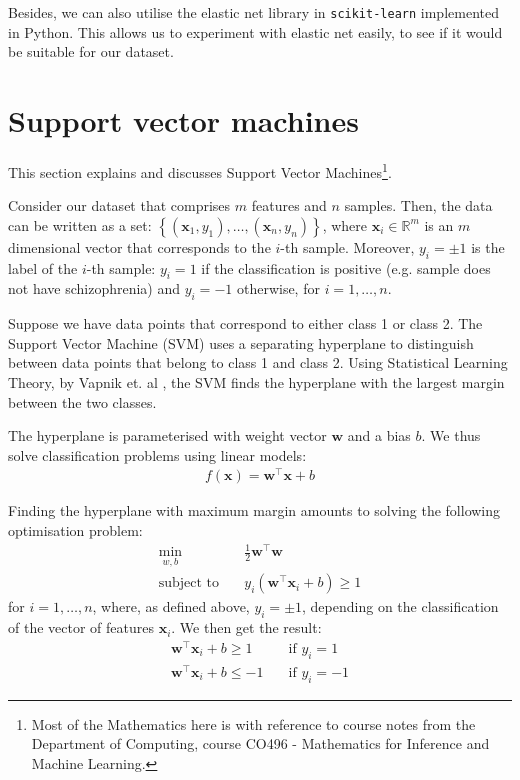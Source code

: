 \documentclass[12pt, twoside, a4paper]{report}
\def\vec{\boldsymbol}
\begin{document}
Besides, we can also utilise the elastic net library in \texttt{scikit-learn} implemented in Python. This allows us to experiment with elastic net easily, to see if it would be suitable for our dataset.


\section{Support vector machines}
This section explains and discusses Support Vector Machines\footnote{Most of the Mathematics here is with reference to course notes from the Department of Computing, course CO496 - Mathematics for Inference and Machine Learning.}.

Consider our dataset that comprises $m$ features and $n$ samples. Then, the data can be written as a set: $\left\lbrace (\boldsymbol{x}_1, y_1), \dots, (\boldsymbol{x}_n, y_n) \right\rbrace$, where $\boldsymbol{x}_i \in \mathbb{R}^m$ is an $m$ dimensional vector that corresponds to the $i$-th sample. Moreover, $y_i = \pm 1$ is the label of the $i$-th sample: $y_i = 1$ if the classification is positive (e.g. sample does not have schizophrenia) and $y_i = -1$ otherwise, for $i = 1, \dots , n$.

Suppose we have data points that correspond to either class 1 or class 2. The Support Vector Machine (SVM) \cite{RefWorks:122} uses a separating hyperplane to distinguish between data points that belong to class 1 and class 2. Using Statistical Learning Theory, by Vapnik et. al \cite{RefWorks:122}, the SVM finds the hyperplane with the largest margin between the two classes.

The hyperplane is parameterised with weight vector $\boldsymbol w$ and a bias $b$. We thus solve classification problems using linear models:
\begin{align}
f(\vec{x}) = \vec{w}^\top \vec{x} + b \label{bg:svm:linear_model}
\end{align}

Finding the hyperplane with maximum margin amounts to solving the following optimisation problem:
\begin{align}
\min_{w, b} \quad &\frac{1}{2} \boldsymbol w^\top \boldsymbol w \label{bg:svm} \\
\text{subject to} \quad & y_i(\boldsymbol w^\top \boldsymbol x_i + b) \geq 1 \label{bg:svm:cond} 
\end{align}
for $i = 1, \dots , n$, where, as defined above, $y_i = \pm 1$, depending on the classification of the vector of features $\boldsymbol x_i$. We then get the result:
\begin{align*}
\boldsymbol w^\top \boldsymbol x_i + b \geq 1 \quad &\text{if $y_i = 1$} \\
\boldsymbol w^\top \boldsymbol x_i + b \leq -1 \quad &\text{if $y_i = -1$}
\end{align*}
\end{document}
